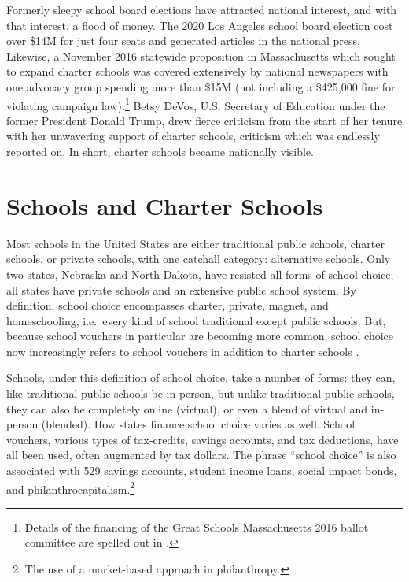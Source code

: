 Formerly sleepy school board elections have attracted national interest, and with that interest, a flood of money. The 2020 Los Angeles school board election cost over \$14M for just four seats and generated articles in the national press. Likewise, a November 2016 statewide proposition in Massachusetts which sought to expand charter schools was covered extensively by national newspapers with one advocacy group spending more than \$15M (not including a \$425,000 fine for violating campaign law).\footnote{Details of the financing of the Great Schools Massachusetts 2016 ballot committee are spelled out in \textcite{Cunningham2021}.} Betsy DeVos, U.S. Secretary of Education under the former President Donald Trump, drew fierce criticism from the start of her tenure with her unwavering support of charter schools, criticism which was endlessly reported on. In short, charter schools became nationally visible. 

\section{Schools and Charter Schools}\indent

Most schools in the United States are either traditional public schools, charter schools, or private schools, with one catchall category: alternative schools.  Only two states, Nebraska and North Dakota, have resisted all forms of school choice; all states have private schools and an extensive public school system. By definition, school choice encompasses charter, private, magnet, and homeschooling, i.e.~every kind of school traditional except public schools. But, because school vouchers in particular are becoming more common, school choice now increasingly refers to school vouchers in addition to charter schools \parencite{Enlow2022}.

Schools, under this definition of school choice, take a number of forms: they can, like traditional public schools be in-person, but unlike traditional public schools, they can also be completely online (virtual), or even a blend of virtual and in-person (blended). How states finance school choice varies as well. School vouchers, various types of tax-credits, savings accounts, and tax deductions, have all been used, often augmented by tax dollars. The phrase ``school choice'' is also associated with 529 savings accounts, student income loans, social impact bonds, and philanthrocapitalism.\footnote{The use of a market-based approach in philanthropy.}

